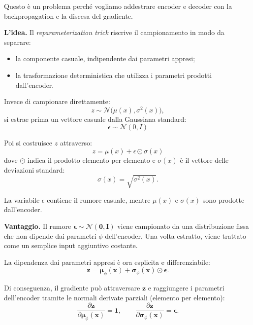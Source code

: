 \documentclass[11pt,a4paper]{article}
\providecommand{\E}{\mathbb{E}}
\providecommand{\Normal}{\mathcal{N}}
\begin{document}
Questo è un problema perché vogliamo addestrare encoder e decoder con la backpropagation e la discesa del gradiente.

\textbf{L'idea.} Il \textit{reparameterization trick} riscrive il campionamento in modo da separare:
\begin{itemize}
    \item la componente casuale, indipendente dai parametri appresi;
    \item la trasformazione deterministica che utilizza i parametri prodotti dall'encoder.
\end{itemize}
Invece di campionare direttamente:
\[
z\sim\Normal\big(\mu(x),\sigma^2(x)\big),
\]
si estrae prima un vettore casuale dalla Gaussiana standard:
\[
\boxed{
\epsilon\sim\Normal(0,I)
}
\]

Poi si costruisce $z$ attraverso:
\[
\boxed{
z=\mu(x)+\epsilon\odot\sigma(x)
}
\]
dove $\odot$ indica il prodotto elemento per elemento e $\sigma(x)$ è il vettore delle deviazioni standard:
\[
\sigma(x)=\sqrt{\sigma^2(x)}.
\]

La variabile $\epsilon$ contiene il rumore casuale, mentre $\mu(x)$ e $\sigma(x)$ sono prodotte dall'encoder.


\textbf{Vantaggio.} Il rumore $\boldsymbol{\epsilon} \sim \mathcal{N}(\mathbf{0}, \mathbf{I})$ viene campionato da una 
distribuzione fissa che non dipende dai parametri $\phi$ dell'encoder. Una volta estratto, 
viene trattato come un semplice input aggiuntivo costante.

La dipendenza dai parametri appresi è ora esplicita e differenziabile:
\[
    \mathbf{z} = \boldsymbol{\mu}_\phi(\mathbf{x}) + \boldsymbol{\sigma}_\phi(\mathbf{x}) \odot \boldsymbol{\epsilon}.
\]

Di conseguenza, il gradiente può attraversare $\mathbf{z}$ e raggiungere i parametri dell'encoder tramite le normali
 derivate parziali (elemento per elemento):
\[
    \frac{\partial \mathbf{z}}{\partial \boldsymbol{\mu}_\phi(\mathbf{x})} = \mathbf{1},
    \qquad
    \frac{\partial \mathbf{z}}{\partial \boldsymbol{\sigma}_\phi(\mathbf{x})} = \boldsymbol{\epsilon}.
\]
\end{document}
